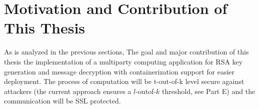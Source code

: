 \section{Motivation and Contribution of This Thesis}

As is analyzed in the previous sections, The goal and major contribution of this thesis the implementation of a multiparty computing application for RSA key generation and message decryption with containerization support for easier deployment. The process of computation will be t-out-of-k level secure against attackers (the current approach ensures a $l$-outof-$k$ threshold, see Part E) and the communication will be SSL protected.
